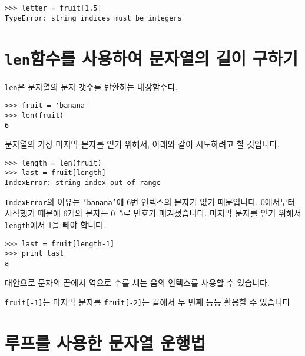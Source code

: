 
\beforeverb
\begin{verbatim}
>>> letter = fruit[1.5]
TypeError: string indices must be integers
\end{verbatim}
\afterverb
%

\section{{\tt len}함수를 사용하여 문자열의 길이 구하기}


{\tt len}은 문자열의 문자 갯수를 반환하는 내장함수다.

\beforeverb
\begin{verbatim}
>>> fruit = 'banana'
>>> len(fruit)
6
\end{verbatim}
\afterverb
%

문자열의 가장 마지막 문자를 얻기 위해서, 아래와 같이 시도하려고 할 것입니다.


\beforeverb
\begin{verbatim}
>>> length = len(fruit)
>>> last = fruit[length]
IndexError: string index out of range
\end{verbatim}
\afterverb
%

{\tt IndexError}의 이유는 {\tt 'banana'}에 6번 인텍스의 문자가 없기 때문입니다.
0에서부터 시작했기 때문에 6개의 문자는 0~5로 번호가 매겨졌습니다. 마지막 문자를 얻기 위해서 
{\tt length}에서 1을 빼야 합니다.


\beforeverb
\begin{verbatim}
>>> last = fruit[length-1]
>>> print last
a
\end{verbatim}
\afterverb
%

대안으로 문자의 끝에서 역으로 수를 세는 음의 인텍스를 사용할 수 있습니다. 

{\tt fruit[-1]}는 마지막 문자를 {\tt fruit[-2]}는 끝에서 두 번째 등등 활용할 수 있습니다.



\section{루프를 사용한 문자열 운행법}
\label{for}


